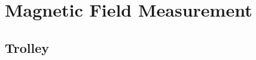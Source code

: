 \chapter{Magnetic Field Measurement}
\label{chapter:Magnetic Field Measurement}
\thispagestyle{myheadings} %

\section{Trolley}
\label{sec:Trolley}
